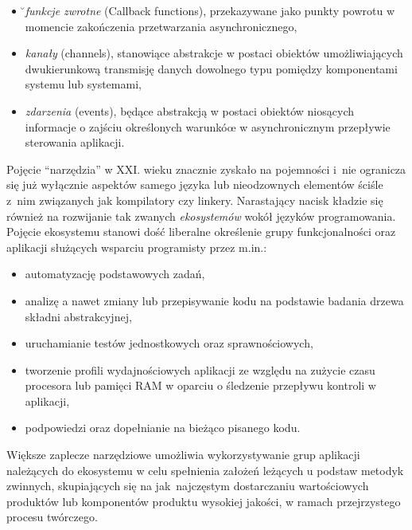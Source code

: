 {\begin{itemize}
  \begin{itemize}
    \item ̆\emph{funkcje zwrotne} (Callback functions), przekazywane jako punkty powrotu w momencie zakończenia przetwarzania asynchronicznego,
    \item \emph{kanały} (channels), stanowiące abstrakcje w postaci obiektów umożliwiających dwukierunkową transmisję danych dowolnego typu pomiędzy komponentami systemu lub systemami,
    \item \emph{zdarzenia} (events), będące abstrakcją w postaci obiektów niosących informacje o zajściu określonych warunkóœ w asynchronicznym przepływie sterowania aplikacji.
  \end{itemize}
\end{itemize}
}

\par{
  Pojęcie ``narzędzia'' w XXI. wieku znacznie zyskało na pojemności i~nie ogranicza się już wyłącznie aspektów samego języka lub nieodzownych elementów ściśle z~nim związanych jak kompilatory czy linkery.
  Narastający nacisk kładzie się również na rozwijanie tak zwanych \emph{ekosystemów} wokół języków programowania.
  Pojęcie ekosystemu stanowi dość liberalne określenie grupy funkcjonalności oraz aplikacji służących wsparciu programisty przez m.in.:
  \begin{itemize}
    \item automatyzację podstawowych zadań,
    \item analizę a nawet zmiany lub przepisywanie kodu na podstawie badania drzewa składni abstrakcyjnej,
    \item uruchamianie testów jednostkowych oraz sprawnościowych,
    \item tworzenie profili wydajnościowych aplikacji ze względu na zużycie czasu procesora lub pamięci RAM w oparciu o śledzenie przepływu kontroli w aplikacji,
    \item podpowiedzi oraz dopełnianie na bieżąco pisanego kodu.
  \end{itemize}
}

\par{
  Większe zaplecze narzędziowe umożliwia wykorzystywanie grup aplikacji należących do ekosystemu w celu spełnienia założeń leżących u podstaw metodyk zwinnych, skupiających się na jak najczęstym dostarczaniu wartościowych produktów lub komponentów produktu wysokiej jakości, w ramach przejrzystego procesu twórczego.
}


